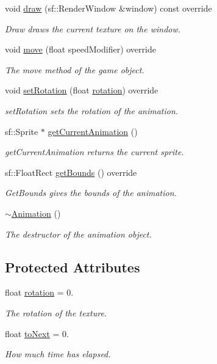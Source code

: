 \begin{DoxyCompactItemize}
void \hyperlink{class_animation_a08a39c329c9c63d8569a1fd103542dda}{draw} (sf\+::\+Render\+Window \&window) const override
\begin{DoxyCompactList}\small\item\em Draw draws the current texture on the window. \end{DoxyCompactList}\item 
void \hyperlink{class_animation_a677d0633c20bcd49eab9513e1d47e20a}{move} (float speed\+Modifier) override
\begin{DoxyCompactList}\small\item\em The move method of the game object. \end{DoxyCompactList}\item 
void \hyperlink{class_animation_a539ba77ceb4c5e3677ac16a364afc627}{set\+Rotation} (float \hyperlink{class_animation_a5c68dd5bc1004cf064ff0c2d3aad9abb}{rotation}) override
\begin{DoxyCompactList}\small\item\em set\+Rotation sets the rotation of the animation. \end{DoxyCompactList}\item 
sf\+::\+Sprite $\ast$ \hyperlink{class_animation_afcc78d89a6cc01d6c9b8ba0753e3d83d}{get\+Current\+Animation} ()
\begin{DoxyCompactList}\small\item\em get\+Current\+Animation returns the current sprite. \end{DoxyCompactList}\item 
sf\+::\+Float\+Rect \hyperlink{class_animation_a7fbae20a3e33a7388da42da937016c25}{get\+Bounds} () override
\begin{DoxyCompactList}\small\item\em Get\+Bounds gives the bounds of the animation. \end{DoxyCompactList}\item 
\hyperlink{class_animation_a401b68793d4fbf48d481c030ee4b2a16}{$\sim$\+Animation} ()
\begin{DoxyCompactList}\small\item\em The destructor of the animation object. \end{DoxyCompactList}\end{DoxyCompactItemize}
\subsection*{Protected Attributes}
\begin{DoxyCompactItemize}
\item 
float \hyperlink{class_animation_a5c68dd5bc1004cf064ff0c2d3aad9abb}{rotation} = 0.
\begin{DoxyCompactList}\small\item\em The rotation of the texture. \end{DoxyCompactList}\item 
float \hyperlink{class_animation_afd9ad77afa13d0dc50586e0780ab6b20}{to\+Next} = 0.
\begin{DoxyCompactList}\small\item\em How much time has elapsed. \end{DoxyCompactList}\end{DoxyCompactItemize}

